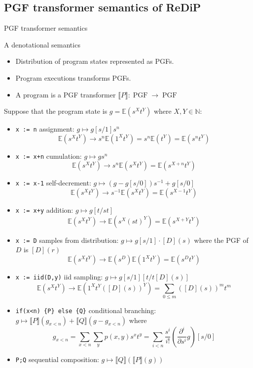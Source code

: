 \documentclass[8pt]{beamer}
\DeclareMathOperator*{\PGF}{PGF}
\renewcommand{\S}[1]{ \llbracket #1 \rrbracket }
\begin{document}
\subsection{PGF transformer semantics of ReDiP}
\begin{frame}[allowframebreaks]{PGF transformer semantics}
	\begin{block}{A denotational semantics}
		\begin{itemize}
			\item Distribution of program states represented as PGFs.
			\item Program executions transforms PGFs.
			\item A program is a PGF transformer \(\S{P}: \PGF\to\PGF\)
		\end{itemize}
	\end{block}

	Suppose that the program state is \(g = \mathbb{E}(s^X t^Y)\) where \(X,Y\in\mathbb{N}\):
	\begin{itemize}
		\item \texttt{x := n} assignment: \(g\mapsto g[s/1] s^n\)
		      \[
			      \mathbb{E}(s^X t^Y) \to s^n \mathbb{E}(1^X t^Y) = s^n \mathbb{E}(t^Y) = \mathbb{E}(s^n t^Y)
		      \]
		\item  \texttt{x := x+n} cumulation: \(g\mapsto g s^n\)
		      \[
			      \mathbb{E}(s^X t^Y) \to s^n \mathbb{E}(s^X t^Y) = \mathbb{E}(s^{X+n} t^Y)
		      \]
		\item  \texttt{x := x-1} self-decrement: \(g\mapsto (g-g[s/0])s^{-1} + g[s/0]\)
		      \[
			      \mathbb{E}(s^X t^Y) \to s^{-1}\mathbb{E}(s^X t^Y) = \mathbb{E}(s^{X-1} t^Y)
		      \]
		\item \texttt{x := x+y} addition: \(g\mapsto g[t/st]\)
		      \[
			      \mathbb{E}(s^X t^Y) \to \mathbb{E}(s^X (st)^Y) = \mathbb{E}(s^{X+Y} t^Y)
		      \]
		      \framebreak
		\item \texttt{x := D} samples from distribution: \(g\mapsto g[s/1] \cdot [D](s)\) where the PGF of \(D\) is \([D](r)\)
		      \[
			      \mathbb{E}(s^X t^Y) \to \mathbb{E}(s^D) \mathbb{E}(1^X t^Y) = \mathbb{E}(s^D t^Y)
		      \]
		\item \texttt{x := iid(D,y)} iid sampling: \(g\mapsto g[s/1][t/t[D](s)]\)
		      \[
			      \mathbb{E}(s^X t^Y) \to \mathbb{E}(1^X t^Y {([D](s))}^Y) = \sum_{0\leq m} {([D](s))}^m t^m
		      \]
		\item \texttt{if(x<n) \{P\} else \{Q\}} conditional branching: \( g\mapsto \S{P}(g_{x<n}) + \S{Q}(g-g_{x<n}) \) where
		      \[
			      g_{x<n} = \sum_{x<n} \sum_y p(x,y) s^x t^y = \sum_{i<n} \frac{s^i}{i!} \left(\frac{\partial^i}{\partial s^i}g\right)[s/0]
		      \]
		\item \texttt{P;Q} sequential composition: \(g\mapsto \S{Q}(\S{P}(g))\)
	\end{itemize}


\end{frame}
\end{document}

